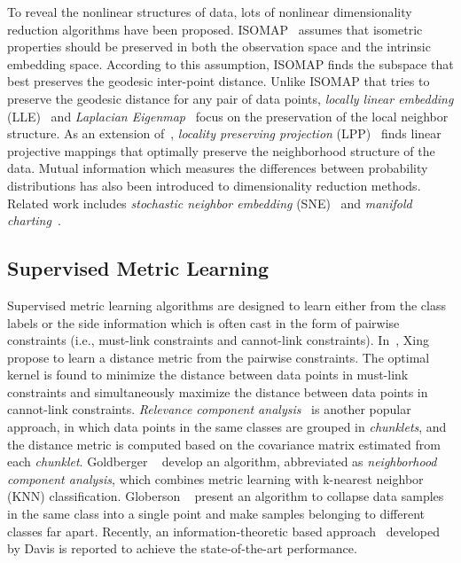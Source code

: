 To reveal the nonlinear structures of data, lots of nonlinear dimensionality reduction algorithms have been proposed. \mbox{ISOMAP}~\cite{tenenbaum2000science} assumes that isometric properties should be preserved in both the observation space and the intrinsic embedding space. According to this assumption, \mbox{ISOMAP} finds the subspace that best preserves the geodesic inter-point distance. Unlike \mbox{ISOMAP} that tries to preserve the geodesic distance for any pair of data points, \textit{locally linear embedding} (\mbox{LLE})~\cite{Roweis2000science} and \textit{Laplacian Eigenmap}~\cite{belkin2003nc} focus on the preservation of the local neighbor structure. As an extension of~\cite{belkin2003nc}, \textit{locality preserving projection} (\mbox{LPP})~\cite{he2003nips} finds linear projective mappings that optimally preserve the neighborhood structure of the data. Mutual information which measures the differences between probability distributions has also been introduced to dimensionality reduction methods. Related work includes \textit{stochastic neighbor embedding} (\mbox{SNE})~\cite{hinton2002nips} and \textit{manifold charting}~\cite{brand2002nips}.

\subsection{Supervised Metric Learning}
Supervised metric learning algorithms are designed to learn either from the class labels or the side information which is often cast in the form of pairwise constraints (i.e., must-link constraints and cannot-link constraints). In~\cite{xing2002nips}, Xing \etal propose to learn a distance metric from the pairwise constraints. The optimal kernel is found to minimize the distance between data points in must-link constraints and simultaneously maximize the distance between data points in cannot-link constraints. \textit{Relevance component analysis}~\cite{shental2002eccv} is another popular approach, in which data points in the same classes are grouped in \textit{chunklets}, and the distance metric is computed based on the covariance matrix estimated from each \textit{chunklet}. Goldberger \etal~\cite{goldberger2004nips} develop an algorithm, abbreviated as \textit{neighborhood component analysis}, which combines metric learning with k-nearest neighbor (KNN) classification. Globerson \etal~\cite{globerson2005nips} present an algorithm to collapse data samples in the same class into a single point and make samples belonging to different classes far apart. Recently, an information-theoretic based approach~\cite{davis2007icml} developed by Davis \etal is reported to achieve the state-of-the-art performance.

